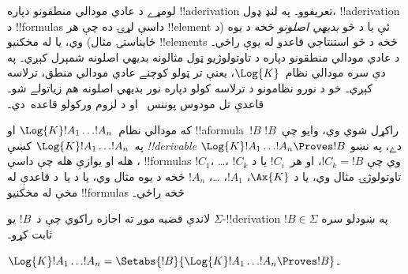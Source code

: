 \documentclass[../../../include/open-logic-section]{subfiles}
\begin{document}


لومړے د عادي مودالي منطقونو دپاره !!a{derivation}
تعريفوو۔ په لنډ ډول، !!a{derivation} د !!{formula}s
داسې لړۍ ده چې هر !!{element} ئې يا د څو
\emph{بديهي اصلونو} څخه د يوه (د ځايناستۍ مثال)
وي، يا له مخکنيو !!{element}s څخه د څو استنتاجي
قاعدو له يوې راځي۔ د عادي مودالي منطقونو دپاره
د تاوتولوژيو
ټول مثالونه بديهي اصلونه شمېرل کېږي۔ په دې سره
مودالي نظام~$\Log{K}$، يعنې تر ټولو کوچنے عادي
مودالي منطق، ترلاسه کېږي۔ خو د نورو نظامونو د
ترلاسه کولو دپاره نور بديهي اصلونه هم زياتولے شو۔
قاعدې تل مودوس پوننس~\MP{} او د لزوم ورکولو قاعده~\Nec دي۔

\begin{defn}
  که مودالي نظام~$\Log{K} !A_1 \dots !A_n$ او
  !!a{formula}~$!B$ راکړل شوي وي، وايو چې~$!B$
  په~$\Log{K} !A_1 \dots !A_n$ کښې \emph{!!{derivable}}
  دے، په نښو $\Log{K} !A_1 \dots !A_n \Proves !B$،
  هله او يوازې هله چې داسې !!{formula}s $!C_1$،
  \dots، $!C_k$ وي چې $!C_k = !B$، او هر~$!C_i$ يا
  د تاوتولوژۍ مثال وي، يا د $\Ax{K}$، $!A_1$، \dots، $!A_n$ څخه د يوه مثال
  وي، يا د \MP{} يا~\Nec د قاعدې له مخې له مخکنيو
  !!{formula}s څخه راځي۔
\end{defn}

لاندې قضيه موږ ته اجازه راکوي چې د~$!B$ يو
$\Sigma$-!!{derivation} په ښودلو سره
$!B \in \Sigma$ ثابت کړو۔

\begin{prop}
  $\Log{K} !A_1 \dots !A_n = \Setabs{!B}{\Log{K} !A_1 \dots !A_n \Proves !B}$۔
\end{prop}
\end{document}
